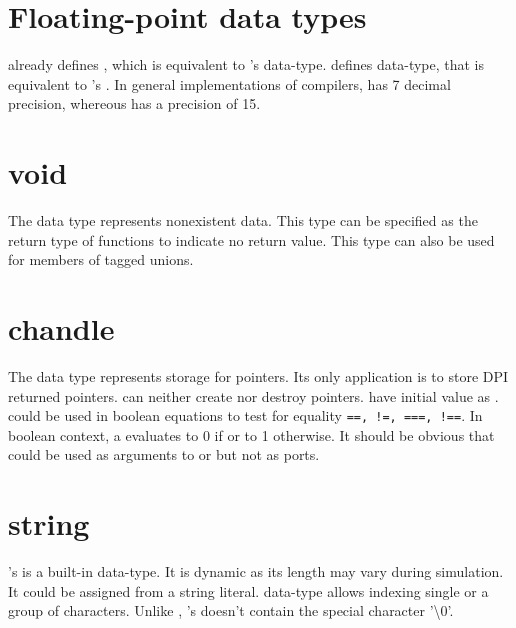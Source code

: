 \section{Floating-point data types}
\lvlog already defines \kwreal, which is equivalent to \lc's
 data-type. \lsvlog defines \kwshortreal data-type, that is
equivalent to \lc's . In general implementations of \lc
compilers,  has 7 decimal precision, whereous 
has a precision of 15.

\section{void}
The \kwvoid data type represents nonexistent data. This type can be
specified as the return type of functions to indicate no return
value. This type can also be used for members of tagged unions.

\section{chandle}
The \kwchandle data type represents storage for pointers. Its only
application is to store DPI returned pointers. \lsvlog can neither
create nor destroy \lc pointers. \kwchandle have initial value as
\kwnull. \kwchandle could be used in boolean equations to test for
equality \texttt{==, !=, ===, !==}. In boolean context, a \kwchandle
evaluates to 0 if \kwnull or to 1 otherwise. It should be obvious that
\kwchandle could be used as arguments to \kwfunction or \kwtask but
not as ports.

\section{string}
\lsvlog's \kwstring is a built-in data-type. It is dynamic as its
length may vary during simulation. It could be assigned from a
string literal. \kwstring data-type allows indexing single or a group
of characters. Unlike \lc, \lsvlog's \kwstring doesn't contain the
special character '\textbackslash{}0'.

